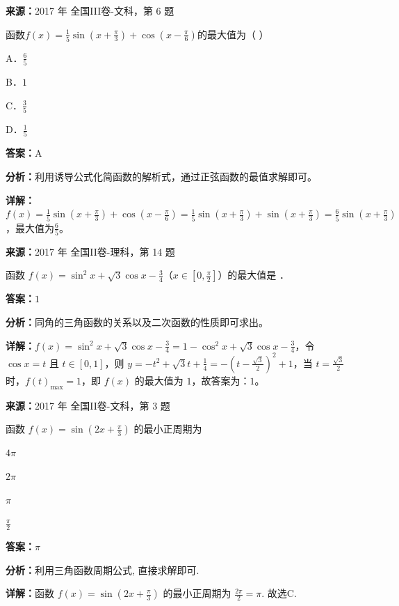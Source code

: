 \begin{question}[points=5]
\textbf{来源：}2017 年 全国III卷-文科，第 6 题\par
函数$f(x)=\frac{1}{5}\sin(x+\frac{\pi}{3})+\cos(x-\frac{\pi}{6})$的最大值为（   ）
\begin{choices}
  \item A．$\frac{6}{5}$
  \item B．$1$
  \item C．$\frac{3}{5}$
  \item D．$\frac{1}{5}$
\end{choices}
\begin{solution}
\textbf{答案：}A

\textbf{分析：}利用诱导公式化简函数的解析式，通过正弦函数的最值求解即可。

\textbf{详解：}$f(x)=\frac{1}{5}\sin(x+\frac{\pi}{3})+\cos(x-\frac{\pi}{6})=\frac{1}{5}\sin(x+\frac{\pi}{3})+\sin(x+\frac{\pi}{3})=\frac{6}{5}\sin(x+\frac{\pi}{3})$，最大值为$\frac{6}{5}$。
\end{solution}
\end{question}

\begin{question}[points=5]
\textbf{来源：}2017 年 全国II卷-理科，第 14 题\par
函数 $f(x)=\sin^2x+\sqrt{3}\cos x-\frac{3}{4}$（$x\in[0,\frac{\pi}{2}]$）的最大值是 ．
\fillin[{$1$}]
\begin{solution}
\textbf{答案：}$1$

\textbf{分析：}同角的三角函数的关系以及二次函数的性质即可求出。

\textbf{详解：}$f(x)=\sin^2x+\sqrt{3}\cos x-\frac{3}{4}=1-\cos^2x+\sqrt{3}\cos x-\frac{3}{4}$，令 $\cos x=t$ 且 $t\in[0,1]$，则 $y=-t^2+\sqrt{3}t+\frac{1}{4}=-(t-\frac{\sqrt{3}}{2})^2+1$，当 $t=\frac{\sqrt{3}}{2}$ 时，$f(t)_{\max}=1$，即 $f(x)$ 的最大值为 $1$，故答案为：$1$。
\end{solution}
\end{question}

\begin{question}[points=5]
\textbf{来源：}2017 年 全国II卷-文科，第 3 题\par
函数 $f(x)=\sin\left(2x+\frac{\pi}{3}\right)$ 的最小正周期为
\begin{choices}
  \item $4\pi$
  \item $2\pi$
  \item $\pi$
  \item $\frac{\pi}{2}$
\end{choices}
\begin{solution}
\textbf{答案：}$\pi$

\textbf{分析：}利用三角函数周期公式, 直接求解即可.

\textbf{详解：}函数 $f(x)=\sin\left(2x+\frac{\pi}{3}\right)$ 的最小正周期为 $\frac{2\pi}{2}=\pi$. 故选C.
\end{solution}
\end{question}

